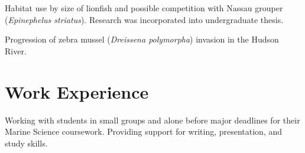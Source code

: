 \documentclass[a4paper]{deedy-resume} %
\begin{document}
Habitat use by size of lionfish and possible competition with Nassau grouper (\textit{Epinephelus striatus}). Research was incorporated into undergraduate thesis.

\sectionspace %



Progression of zebra mussel (\textit{Dreissena polymorpha}) invasion in the Hudson River.

\sectionspace %
\sectionspace



\section{Work Experience}



Working with students in small groups and alone before major deadlines for their Marine Science coursework. Providing support for writing, presentation, and study skills.

\sectionspace




\newpage %


\sectionspace

\end{document}

